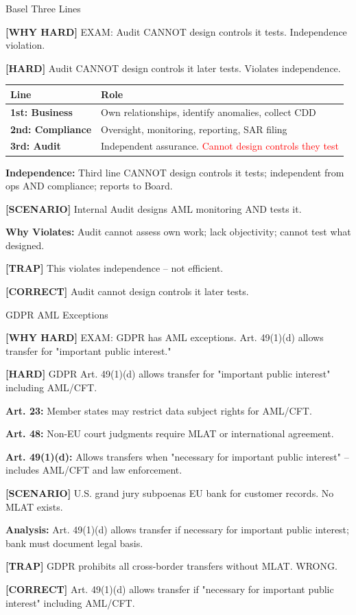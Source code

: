 \documentclass[6pt,aspectratio=169,fontsize=5pt]{beamer}
\renewcommand{\tiny}{\fontsize{3.5pt}{4.5pt}\selectfont}
\renewcommand{\normalsize}{\fontsize{7.5pt}{8.5pt}\selectfont}
\newcommand{\trap}[1]{%
	\begin{block}{\textcolor{redtrap}{\textbf{[TRAP]}}}
		\textcolor{redtrap}{\tiny #1}
	\end{block}
}
\newcommand{\scenario}[1]{%
	\begin{block}{\textbf{[SCENARIO]}}
		\tiny #1
	\end{block}
}
\newcommand{\correct}[1]{%
	\begin{block}{\textcolor{greencorrect}{\textbf{[CORRECT]}}}
		\textcolor{greencorrect}{\tiny #1}
	\end{block}
}
\newcommand{\hard}[1]{%
	\begin{block}{\textcolor{hardcolor}{\textbf{[HARD]}}}
		\textcolor{hardcolor}{\tiny #1}
	\end{block}
}
\newcommand{\hardexplain}[1]{%
	\begin{block}{\textcolor{orangehard}{\textbf{[WHY HARD]}}}
		\textcolor{orangehard}{\tiny #1}
	\end{block}
}
\begin{document}
	\begin{frame}{\normalsize Basel Three Lines}
		
		\hardexplain{EXAM: Audit CANNOT design controls it tests. Independence violation.}
		
		\hard{Audit CANNOT design controls it later tests. Violates independence.}
		
		\begin{table}
			\begin{tabular}{|p{2.2cm}|p{5.5cm}|}
				\hline
				\textbf{Line} & \textbf{Role} \\
				\hline
				\textbf{1st: Business} & Own relationships, identify anomalies, collect CDD \\
				\hline
				\textbf{2nd: Compliance} & Oversight, monitoring, reporting, SAR filing \\
				\hline
				\textbf{3rd: Audit} & Independent assurance. \textcolor{red}{Cannot design controls they test} \\
				\hline
			\end{tabular}
		\end{table}
		
		\textbf{Independence:} Third line CANNOT design controls it tests; independent from ops AND compliance; reports to Board.
		
		\scenario{Internal Audit designs AML monitoring AND tests it.}
		
		\textbf{Why Violates:} Audit cannot assess own work; lack objectivity; cannot test what designed.
		
		\trap{This violates independence -- not efficient.}
		
		\correct{Audit cannot design controls it later tests.}
	\end{frame}
	
	\begin{frame}{\normalsize GDPR AML Exceptions}
		
		\hardexplain{EXAM: GDPR has AML exceptions. Art. 49(1)(d) allows transfer for "important public interest."}
		
		\hard{GDPR Art. 49(1)(d) allows transfer for "important public interest" including AML/CFT.}
		
		\textbf{Art. 23:} Member states may restrict data subject rights for AML/CFT.
		
		\textbf{Art. 48:} Non-EU court judgments require MLAT or international agreement.
		
		\textbf{Art. 49(1)(d):} Allows transfers when "necessary for important public interest" -- includes AML/CFT and law enforcement.
		
		\scenario{U.S. grand jury subpoenas EU bank for customer records. No MLAT exists.}
		
		\textbf{Analysis:} Art. 49(1)(d) allows transfer if necessary for important public interest; bank must document legal basis.
		
		\trap{GDPR prohibits all cross-border transfers without MLAT. WRONG.}
		
		\correct{Art. 49(1)(d) allows transfer if "necessary for important public interest" including AML/CFT.}
	\end{frame}
	
\end{document}
